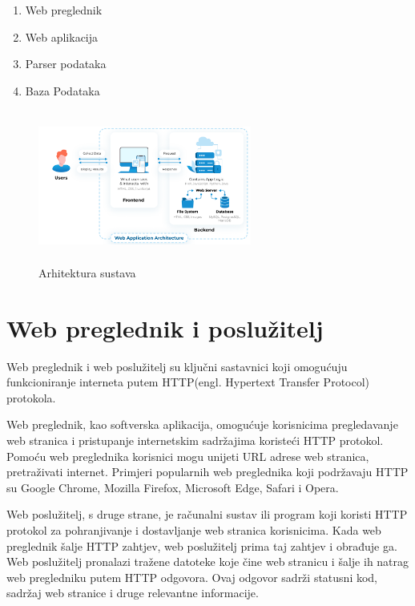 \documentclass[times, utf8, zavrsni]{fer}
\begin{document}
              \begin{enumerate}
               \item  Web  preglednik
                \item   Web aplikacija
	      \item   Parser podataka
                \item    Baza Podataka
                \end{enumerate}
	      \begin{figure}
                     \includegraphics[width=7cm, height=5cm ]{./img/arhitektura.png}
                      \centering
                      \caption{Arhitektura sustava}
                  \end{figure}
	
\section{Web preglednik i poslužitelj}
Web preglednik i web poslužitelj su ključni sastavnici koji omogućuju funkcioniranje interneta putem HTTP(engl. Hypertext Transfer Protocol) protokola.

Web preglednik, kao softverska aplikacija, omogućuje korisnicima pregledavanje web stranica i pristupanje internetskim sadržajima koristeći HTTP protokol.
 Pomoću web preglednika korisnici mogu unijeti URL adrese web stranica, pretraživati internet.
 Primjeri popularnih web preglednika koji podržavaju HTTP su Google Chrome, Mozilla Firefox, Microsoft Edge, Safari i Opera.

Web poslužitelj, s druge strane, je računalni sustav ili program koji koristi HTTP protokol za pohranjivanje i dostavljanje web stranica korisnicima.
 Kada web preglednik šalje HTTP zahtjev, web poslužitelj prima taj zahtjev i obrađuje ga.
 Web poslužitelj pronalazi tražene datoteke koje čine web stranicu i šalje ih natrag web pregledniku putem HTTP odgovora.
 Ovaj odgovor sadrži statusni kod, sadržaj web stranice i druge relevantne informacije.
\end{document}
